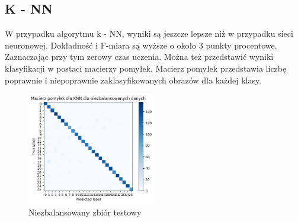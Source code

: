 \subsection{K - NN}\label{subsec:testowanie_knn}
\begin{table}[H]
    \centering
    \caption{Dokładność i F-miara dla zbioru testowego dla k = 3}
    \label{tab:acc_f_measure_knn}
\end{table}
W przypadku algorytmu k - NN, wyniki są jeszcze lepsze niż w przypadku sieci neuronowej. Dokładność i F-miara są wyższe o około 3 punkty procentowe. Zaznaczając przy tym zerowy czas uczenia.
Można też przedstawić wyniki klasyfikacji w postaci macierzy pomyłek. Macierz pomyłek przedstawia liczbę poprawnie i niepoprawnie zaklasyfikowanych obrazów dla każdej klasy.
\begin{figure}[H]
    \centering
    \includegraphics[width=0.5\textwidth]{img/confusion_not_balanced.png}
    \caption{Niezbalansowany zbiór testowy}
    \label{fig:confusion_matrix_knn_unbalanced}
\end{figure}
